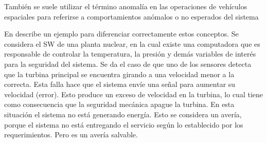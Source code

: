 También se suele utilizar el término anomalía en las operaciones de vehículos espaciales para 
referirse a comportamientos anómalos o no esperados del sistema \citep{SpaceSystemFailures}

En \cite{FTDesign} describe un ejemplo para diferenciar correctamente estos conceptos. Se considera 
el \ac{SW} de una planta nuclear, en la cual existe una computadora que es responsable de controlar 
la temperatura, la presión y demás variables de interés para la seguridad del sistema. Se da el 
caso de que uno de los sensores detecta que la turbina principal se encuentra girando a una 
velocidad menor a la correcta. Esta falla hace que el sistema envíe una señal para aumentar su 
velocidad (error). Esto produce un exceso de velocidad en la turbina, lo cual tiene como 
consecuencia que la seguridad mecánica apague la turbina. En esta situación el sistema no está 
generando energía. Esto se considera un avería, porque el sistema no está entregando el servicio 
según lo establecido por los requerimientos. Pero es un avería salvable. 
